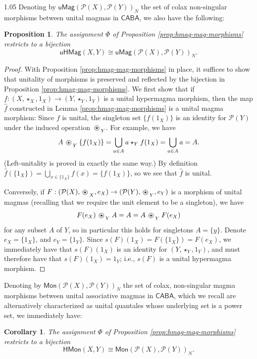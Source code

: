\documentclass[reqno]{amsart}
\newcommand{\ostar}{%
  \mathbin{%
    \tikz[baseline=(s.base)]{
      \node (s) at (0,0) {$\star$};
      \draw[line width=0.4pt] (s.center) circle[radius=0.82ex];
    }%
  }%
}
\newcommand{\pow}{\mathcal{P}}
\newcommand{\cat}{\mathsf}
\numberwithin{equation}{section}
\theoremstyle{plain}
\newtheorem{corollary}[equation]{Corollary}
\newtheorem{proposition}[equation]{Proposition}
\theoremstyle{definition}
\begin{document}
\begin{spacing}{1.05}
Denoting by $\cat{uMag}(\pow(X),\pow(Y))_N$ the set of colax non-singular morphisms between unital magmas in $\cat{CABA}$, we also have the following:

\begin{proposition} \label{prop:uhmag-mag-morphisms}
    The assignment $\Phi$ of Proposition \ref{prop:hmag-mag-morphisms} restricts to a bijection $$ \cat{uHMag}(X,Y) \cong \cat{uMag}(\pow(X),\pow(Y))_N. $$
\end{proposition}

\begin{proof}
    With Proposition \ref{prop:hmag-mag-morphisms} in place, it suffices to show that unitality of morphisms is preserved and reflected by the bijection in Proposition \ref{prop:hmag-mag-morphisms}. We first show that if $f : (X, \star_X, 1_X) \to (Y, \star_Y, 1_Y)$ is a unital hypermagma morphism, then the map $\hat{f}$ constructed in Lemma \ref{prop:hmag-mag-morphisms} is a unital magma morphism: Since $f$ is unital, the singleton set $\{f(1_X)\}$ is an identity for $\pow(Y)$ under the induced operation $\ostar_Y$. For example, we have $$ A \ostar_Y \{f(1_X)\} = \bigcup_{a \in A} a \star_Y f(1_X) = \bigcup_{a \in A} a = A.$$ (Left-unitality is proved in exactly the same way.) By definition $\hat{f}(\{1_X\}) = \bigcup_{x \in \{1_X\}}f(x) = \{f(1_X)\}$, so we see that $\hat{f}$ is unital. 
    
    Conversely, if ${F : (\pow(X),\ostar_X,e_X) \to (\pow(Y), \ostar_Y, e_Y)}$ is a morphism of unital magmas (recalling that we require the unit element to be a singleton), we have $$F(e_X) \ostar_Y A = A = A \ostar_Y F(e_X)$$ for any subset $A$ of $Y$, so in particular this holds for singletons $A = \{y\}$. Denote $e_X = \{1_X\}$, and $e_Y = \{1_Y\}$. Since $s(F)(1_X) = F(\{1_X\}) = F(e_X)$, we immediately have that $s(F)(1_X)$ is an identity for $(Y,\star_Y,1_Y)$, and must therefore have that $s(F)(1_X) = 1_Y$; i.e., $s(F)$ is a unital hypermagma morphism.
\end{proof}

Denoting by $\cat{Mon}(\pow(X),\pow(Y))_N$ the set of colax, non-singular magma morphisms between unital associative magmas in $\cat{CABA}$, which we recall are alternatively characterized as unital quantales whose underlying set is a power set, we immediately have:

\begin{corollary}
    \label{prop:hmon-mon-morphisms}
    The assignment $\Phi$ of Proposition \ref{prop:hmag-mag-morphisms} restricts to a bijection $$\cat{HMon}(X,Y) \cong \cat{Mon}(\pow(X),\pow(Y))_N.$$
\end{corollary}


\end{spacing}
\end{document}
